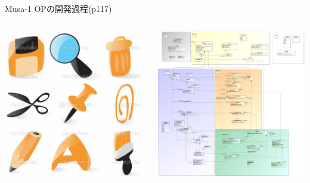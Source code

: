 \begin{frame}{Musa-1 OPの開発過程(p117)}
\begin{columns}
\begin{column}{0.23\textwidth}
\begin{center}
\includegraphics[height=\imageheight]{figure/operations.jpg}
\end{center}
\end{column}

\begin{column}{0.23\textwidth}
\begin{center}
\includegraphics[height=\imageheight]{figure/function.png}
\end{center}
\end{column}

\end{columns}

\end{frame}
